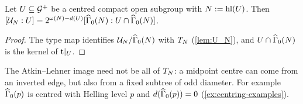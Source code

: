 \begin{lemma}\label{lem:index-formula}
Let $U \subseteq \mathcal{G}^{+}$ be a centred compact open subgroup with
$N := \operatorname{hl}(U)$. Then
$\Index{\MaxCompact{N}}{U} = 2^{\NumPrimeFactors{N}-\ALdim{U}}
\Index{\GammaZero[ad]{N}}{U \cap \GammaZero[ad]{N}}$.
\end{lemma}

\begin{proof}
The type map identifies $\MaxCompact{N}/\GammaZero[ad]{N}$ with
$T_{N}$ (\cref{lem:U_N}), and $U\cap\GammaZero[ad]{N}$ is the kernel
of $\mathrm{t}|_{U}$.
\end{proof}

\begin{remark}
The Atkin--Lehner image need not be all of $T_{N}$: a midpoint
centre can come from an inverted edge, but also from a fixed subtree of
odd diameter. For example $\GammaZero[ad]{p}$ is centred with Helling level
$p$ and $\ALdim{\GammaZero[ad]{p}} = 0$ (\cref{ex:centring-examples}).
\end{remark}

